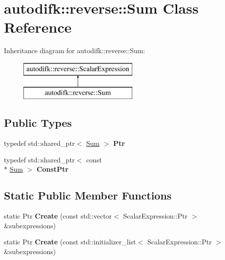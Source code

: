 \hypertarget{classautodifk_1_1reverse_1_1_sum}{\section{autodifk\-:\-:reverse\-:\-:Sum Class Reference}
\label{classautodifk_1_1reverse_1_1_sum}
}
Inheritance diagram for autodifk\-:\-:reverse\-:\-:Sum\-:\begin{figure}[H]
\begin{center}
\leavevmode
\includegraphics[height=2.000000cm]{classautodifk_1_1reverse_1_1_sum}
\end{center}
\end{figure}
\subsection*{Public Types}
\begin{DoxyCompactItemize}
\item 
\hypertarget{classautodifk_1_1reverse_1_1_sum_ade41b60c006c336813c2df6ffb5d8e70}{typedef std\-::shared\-\_\-ptr$<$ \hyperlink{classautodifk_1_1reverse_1_1_sum}{Sum} $>$ {\bfseries Ptr}}\label{classautodifk_1_1reverse_1_1_sum_ade41b60c006c336813c2df6ffb5d8e70}

\item 
\hypertarget{classautodifk_1_1reverse_1_1_sum_af335e061ffb0ff3bbe20b0889919f448}{typedef std\-::shared\-\_\-ptr$<$ const \\*
\hyperlink{classautodifk_1_1reverse_1_1_sum}{Sum} $>$ {\bfseries Const\-Ptr}}\label{classautodifk_1_1reverse_1_1_sum_af335e061ffb0ff3bbe20b0889919f448}

\end{DoxyCompactItemize}
\subsection*{Static Public Member Functions}
\begin{DoxyCompactItemize}
\item 
\hypertarget{classautodifk_1_1reverse_1_1_sum_a01e19f2d761b38724badc72810914faf}{static Ptr {\bfseries Create} (const std\-::vector$<$ Scalar\-Expression\-::\-Ptr $>$ \&subexpressions)}\label{classautodifk_1_1reverse_1_1_sum_a01e19f2d761b38724badc72810914faf}

\item 
\hypertarget{classautodifk_1_1reverse_1_1_sum_aea5e507fdc009b1e23514a9dc7f753e9}{static Ptr {\bfseries Create} (const std\-::initializer\-\_\-list$<$ Scalar\-Expression\-::\-Ptr $>$ \&subexpressions)}\label{classautodifk_1_1reverse_1_1_sum_aea5e507fdc009b1e23514a9dc7f753e9}

\end{DoxyCompactItemize}
